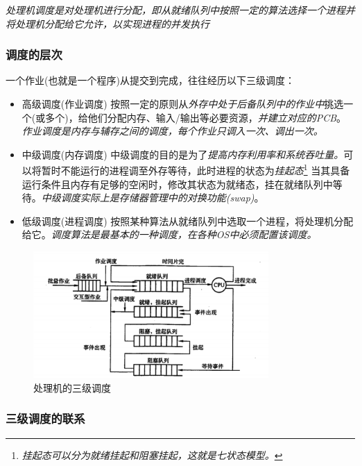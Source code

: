     \emph{处理机调度是对处理机进行分配，即从就绪队列中按照一定的算法选择一个进程并将处理机分配给它允许，以实现进程的并发执行}

\subsubsection{调度的层次}

    一个作业(也就是一个程序)从提交到完成，往往经历以下三级调度：

\begin{itemize}
    \item [1)] 高级调度(作业调度)
    \subitem 按照一定的原则从\emph{外存中处于后备队列中的作业中}挑选一个(或多个)，给他们分配内存、输入/输出等必要资源，\emph{\color{red}并建立对应的PCB}。
    \subitem \emph{作业调度是内存与辅存之间的调度，\color{red}每个作业只调入一次、调出一次。}
    \item [2)] 中级调度(内存调度)
    \subitem 中级调度的目的是为了\emph{提高内存利用率和系统吞吐量。}可以将暂时不能运行的进程调至外存等待，此时进程的状态为\emph{\color{red}挂起态}\footnote[1]{\emph{挂起态可以分为就绪挂起和阻塞挂起，这就是七状态模型。}}
    \subitem 当其具备运行条件且内存有足够的空闲时，修改其状态为就绪态，挂在就绪队列中等待。\emph{中级调度实际上是存储器管理中的对换功能(swap)}。
    \item [3)] 低级调度(进程调度)
    \subitem 按照某种算法从就绪队列中选取一个进程，将处理机分配给它。\emph{调度算法是最基本的一种调度，在各种OS中必须配置该调度。}
\end{itemize}

\begin{figure}[!htbp]
    \centering
    \includegraphics[width=0.8\textwidth]{image/chapter02/处理机三级调度.png}
    \caption{处理机的三级调度}
\end{figure}

\subsubsection{三级调度的联系}

